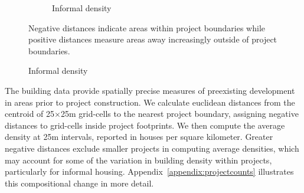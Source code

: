 \documentclass[12pt]{article}
\begin{document}
\begin{figure}[h!]
\begin{subfigure}[b]{0.495\textwidth}
            \caption[]%
            {{\small Informal density}}    
            \label{fig:preinf_raw}
        \end{subfigure}
        \label{fig:rawbblumeans_het}
   {\scriptsize Negative distances indicate areas within project boundaries while positive distances measure areas away increasingly outside of project boundaries.} %
    \end{figure} 


The building data provide spatially precise measures of preexisting development in areas prior to project construction.  We calculate euclidean distances from the centroid of 25$\times$25m grid-cells to the nearest project boundary, assigning negative distances to grid-cells inside project footprints.  We then compute the average density at 25m intervals, reported in houses per square kilometer.  Greater negative distances exclude smaller projects in computing average densities, which may account for some of the variation in building density within projects, particularly for informal housing.  Appendix~\ref{appendix:projectcounts} illustrates this compositional change in more detail.  
\end{document}
